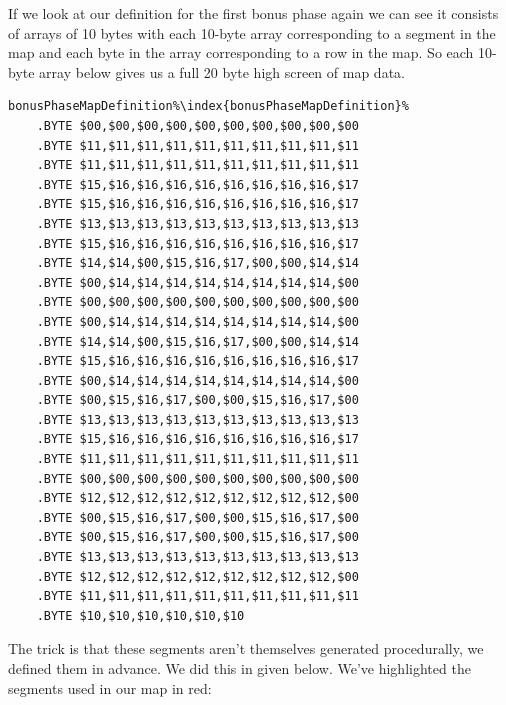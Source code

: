 If we look at our definition for the first bonus phase  again we can see it consists of arrays of 10 bytes with
each 10-byte array corresponding to a segment in the map and each byte in the array corresponding to a row in the map. 
So each 10-byte array below gives us a full 20 byte high screen of map data.

\begin{lstlisting}[escapechar=\%]
bonusPhaseMapDefinition%\index{bonusPhaseMapDefinition}% 
    .BYTE $00,$00,$00,$00,$00,$00,$00,$00,$00,$00
    .BYTE $11,$11,$11,$11,$11,$11,$11,$11,$11,$11
    .BYTE $11,$11,$11,$11,$11,$11,$11,$11,$11,$11
    .BYTE $15,$16,$16,$16,$16,$16,$16,$16,$16,$17
    .BYTE $15,$16,$16,$16,$16,$16,$16,$16,$16,$17
    .BYTE $13,$13,$13,$13,$13,$13,$13,$13,$13,$13
    .BYTE $15,$16,$16,$16,$16,$16,$16,$16,$16,$17
    .BYTE $14,$14,$00,$15,$16,$17,$00,$00,$14,$14
    .BYTE $00,$14,$14,$14,$14,$14,$14,$14,$14,$00
    .BYTE $00,$00,$00,$00,$00,$00,$00,$00,$00,$00
    .BYTE $00,$14,$14,$14,$14,$14,$14,$14,$14,$00
    .BYTE $14,$14,$00,$15,$16,$17,$00,$00,$14,$14
    .BYTE $15,$16,$16,$16,$16,$16,$16,$16,$16,$17
    .BYTE $00,$14,$14,$14,$14,$14,$14,$14,$14,$00
    .BYTE $00,$15,$16,$17,$00,$00,$15,$16,$17,$00
    .BYTE $13,$13,$13,$13,$13,$13,$13,$13,$13,$13
    .BYTE $15,$16,$16,$16,$16,$16,$16,$16,$16,$17
    .BYTE $11,$11,$11,$11,$11,$11,$11,$11,$11,$11
    .BYTE $00,$00,$00,$00,$00,$00,$00,$00,$00,$00
    .BYTE $12,$12,$12,$12,$12,$12,$12,$12,$12,$00
    .BYTE $00,$15,$16,$17,$00,$00,$15,$16,$17,$00
    .BYTE $00,$15,$16,$17,$00,$00,$15,$16,$17,$00
    .BYTE $13,$13,$13,$13,$13,$13,$13,$13,$13,$13
    .BYTE $12,$12,$12,$12,$12,$12,$12,$12,$12,$00
    .BYTE $11,$11,$11,$11,$11,$11,$11,$11,$11,$11
    .BYTE $10,$10,$10,$10,$10,$10
\end{lstlisting}

The trick is that these segments aren't themselves
generated procedurally, we defined them in advance.  We did this in 
given below. We've highlighted the segments used in our map in red:


